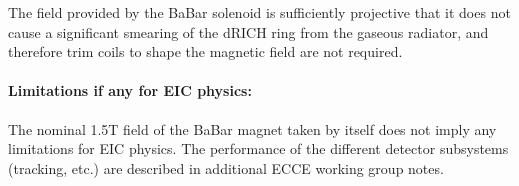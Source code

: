 The field provided by the BaBar solenoid is sufficiently projective that it does not cause a significant smearing of the dRICH ring from the gaseous radiator, and therefore trim coils to shape the magnetic field are not required.  


\paragraph{Limitations if any for EIC physics: \\}
The nominal 1.5T field of the BaBar magnet taken by itself does not imply any limitations for EIC physics.  The performance of the different detector subsystems (tracking, etc.) are described in additional ECCE working group notes. 
